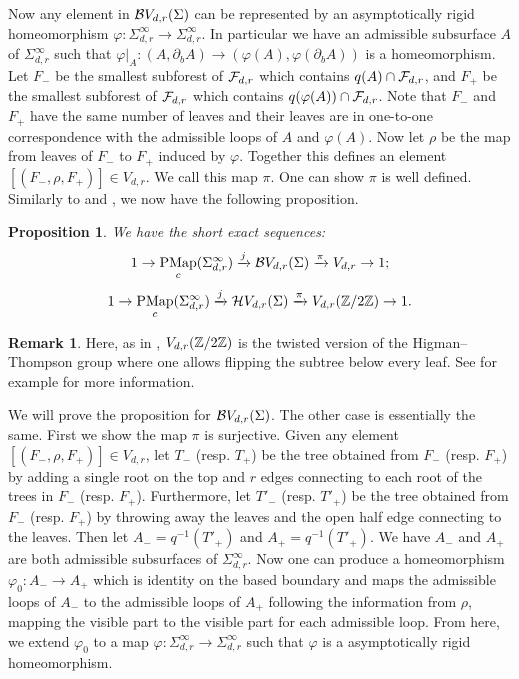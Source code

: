\documentclass[11pt, a4paper]{amsart}
\newtheorem{prop}[thm]{Proposition}
\theoremstyle{definition}
\newtheorem{rem}[thm]{Remark}
\def\Proof{\noindent{\bf Proof.}\quad}
\DeclareMathOperator{\PMap}{PMap}
\begin{document}
Now any element in ${\mathcal {B}} V_{d,r}(\Sigma)$ can be represented by an asymptotically rigid homeomorphism $\varphi:  \Sigma^{\infty}_{d,r} \to {\Sigma}^{\infty}_{d,r}$. In particular we have an admissible subsurface $A$ of $\Sigma^{\infty}_{d,r}$ such that $\varphi|_A :(A,\partial_b A)\to (\varphi(A),\varphi(\partial_b A))$ is a homeomorphism. Let $F_-$ be the smallest subforest of ${\mathcal {F}}_{d,r}$ which contains $q(A) \cap {\mathcal {F}}_{d,r}$, and $F_+$ be the smallest subforest of ${\mathcal {F}}_{d,r}$ which contains $q(\varphi( A)) \cap {\mathcal {F}}_{d,r}$. Note that $F_-$ and $F_+$ have the same number of leaves and their leaves are in one-to-one correspondence with the admissible loops of $A$ and $\varphi(A)$.  Now let $\rho$ be the map from leaves of $F_-$ to $F_+$ induced by $\varphi$. Together this defines an element $[(F_-,\rho,F_+)]\in V_{d,r}$. We call this map $\pi$. One can show $\pi$ is well defined. Similarly to \cite[Proposition 2.4]{FK04} and \cite[Proposition 4.2, 4.6]{AF17}, we now have the following proposition.

\begin{prop}\label{thm-ses-asm}
We have the short exact sequences:
$$ 1 \to \PMap_c(\Sigma_{d,r}^\infty) \xrightarrow{j} \CB V_{d,r}(\Sigma) \xrightarrow{\pi} V_{d,r} \to 1;$$
$$ 1 \to \PMap_c(\Sigma_{d,r}^\infty) \xrightarrow{j} \CH V_{d,r}(\Sigma) \xrightarrow{\pi} V_{d,r}(\BZ/2\BZ) \to 1.$$
\end{prop}

\begin{rem}
Here, as in \cite{AF17}, $V_{d,r}({\mathbb {Z}}/2{\mathbb {Z}}) $ is the twisted version of the Higman--Thompson group where one allows flipping the subtree below every leaf. See for example \cite{BDJ17} for more information.
\end{rem}

\Proof
We will prove the proposition for ${\mathcal {B}} V_{d,r}(\Sigma)$. The other case is essentially the same. First we show the map $\pi$ is surjective. Given any element  $[(F_-,\rho,F_+)] \in V_{d,r}$, let $T_-$ (resp. $T_+$) be the tree obtained from $F_-$  (resp. $F_+$)  by adding a single root on the top and $r$ edges connecting to each root of the trees in $F_-$ (resp. $F_+$). Furthermore, let  $T'_-$ (resp. $T'_+$) be the tree obtained from $F_-$  (resp. $F_+$)  by throwing away the leaves and the open half edge connecting to the leaves. Then let $A_- =q^{-1}(T'_+)$ and $A_+ =q^{-1}(T'_+)$. We have $A_-$ and $A_+$ are both admissible subsurfaces of $\Sigma_{d,r}^{\infty}$.  Now one can produce a homeomorphism $\varphi_0: A_- \to A_+$ which is identity on the based boundary and maps the admissible loops of $A_-$ to the admissible loops of $A_+$ following the information from $\rho$, mapping the visible part to the visible part for each admissible loop. From here, we extend $\varphi_0$ to a map $\varphi: \Sigma_{d,r}^\infty \to \Sigma_{d,r}^\infty$ such that $\varphi$ is a asymptotically rigid homeomorphism. 
\end{document}
